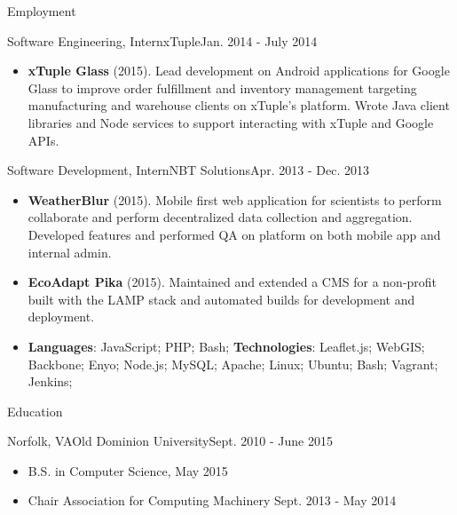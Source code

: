 \documentclass[]{mcdowellcv}
\begin{document}
\begin{cvsection}{Employment}
        \begin{cvsubsection}{Software Engineering, Intern}{xTuple}{Jan. 2014 - July 2014}
            \begin{itemize}
                \item \textbf{xTuple Glass} (2015). Lead development on Android applications for Google Glass to improve order fulfillment and inventory management targeting manufacturing and warehouse clients on xTuple’s platform. Wrote Java client libraries and Node services to support interacting with xTuple and Google APIs.
            \end{itemize}
        \end{cvsubsection}

        \begin{cvsubsection}{Software Development, Intern}{NBT Solutions}{Apr. 2013 - Dec. 2013}
            \begin{itemize}
                \item \textbf{WeatherBlur} (2015). Mobile first web application for scientists to perform collaborate and perform decentralized data collection and aggregation. Developed features and performed QA on platform on both mobile app and internal admin.
                \item \textbf{EcoAdapt Pika} (2015). Maintained and extended a CMS for a non-profit built with the LAMP stack and automated builds for development and deployment.
            \end{itemize}
            \begin{itemize}
                 \item \textbf{Languages}:  JavaScript; PHP; Bash; \newline
                \textbf{Technologies}: Leaflet.js; WebGIS; Backbone; Enyo; Node.js; MySQL; Apache; Linux; Ubuntu; Bash; Vagrant; Jenkins;
            \end{itemize}
        \end{cvsubsection}

    \end{cvsection}

    \begin{cvsection}{Education}
        \begin{cvsubsection}{Norfolk, VA}{Old Dominion University}{Sept. 2010 - June 2015}
            \begin{itemize}
                \item B.S. in Computer Science, May 2015
                \item Chair Association for Computing Machinery Sept. 2013 - May 2014
            \end{itemize}
        \end{cvsubsection}
    \end{cvsection}
\end{document}
